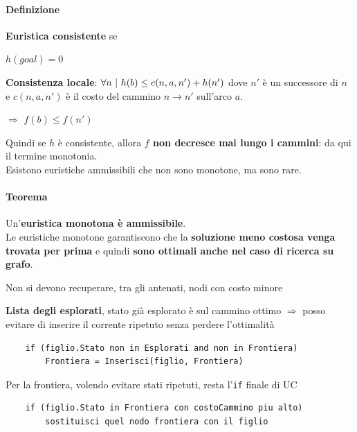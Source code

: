 \documentclass[10pt]{book}
\begin{document}
\paragraph{Definizione} \textbf{Euristica consistente} se
\begin{list}{}{}
	\item $h(goal) = 0$
	\item \textbf{Consistenza locale}: $\forall n\:\:\vline\:\:h(b) \leq c(n, a, n') + h(n')$ dove $n'$ è un successore di $n$ e $c(n, a, n')$ è il costo del cammino $n\rightarrow n'$ sull'arco $a$.
	\item $\Rightarrow$ $f(b) \leq f(n')$
\end{list}
Quindi se $h$ è consistente, allora \textbf{$f$ non decresce mai lungo i cammini}: da qui il termine monotonia.\\
Esistono euristiche ammissibili che non sono monotone, ma sono rare.
\paragraph{Teorema} Un'\textbf{euristica monotona è ammissibile}.\\
Le euristiche monotone garantiscono che la \textbf{soluzione meno costosa venga trovata per prima} e quindi \textbf{sono ottimali anche nel caso di ricerca su grafo}.
\begin{list}{}{}
	\item Non si devono recuperare, tra gli antenati, nodi con costo minore
	\item \textbf{Lista degli esplorati}, stato già esplorato è sul cammino ottimo $\Rightarrow$ posso evitare di inserire il corrente ripetuto senza perdere l'ottimalità
	\begin{lstlisting}
	if (figlio.Stato non in Esplorati and non in Frontiera)
		Frontiera = Inserisci(figlio, Frontiera)
	\end{lstlisting}
	\item Per la frontiera, volendo evitare stati ripetuti, resta l'\texttt{if} finale di UC
	\begin{lstlisting}
	if (figlio.Stato in Frontiera con costoCammino piu alto)
		sostituisci quel nodo frontiera con il figlio
	\end{lstlisting}
\end{list}
\end{document}
